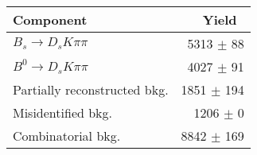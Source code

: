  \begin{tabular}{l r }
\hline\hline
Component & Yield\ \\
\hline
$B_s \to D_s K \pi \pi$ & 5313 $\pm$ 88 \\
$B^{0} \to D_s K \pi \pi$ & 4027 $\pm$ 91 \\
Partially reconstructed bkg. & 1851 $\pm$ 194 \\
Misidentified bkg. & 1206 $\pm$ 0 \\
Combinatorial bkg. & 8842 $\pm$ 169 \\
\hline\hline
\end{tabular}
\label{table:signalYields}
